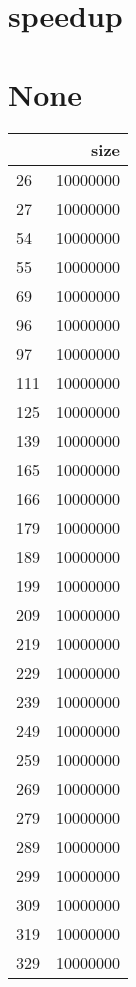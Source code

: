 \documentclass{article}
\begin{document}
\tableofcontents

\section{speedup}


\section{None}
\label{sec:None}
\begin{tabular}{lr}
\toprule
{} &      size \\
\midrule
26  &  10000000 \\
27  &  10000000 \\
54  &  10000000 \\
55  &  10000000 \\
69  &  10000000 \\
96  &  10000000 \\
97  &  10000000 \\
111 &  10000000 \\
125 &  10000000 \\
139 &  10000000 \\
165 &  10000000 \\
166 &  10000000 \\
179 &  10000000 \\
189 &  10000000 \\
199 &  10000000 \\
209 &  10000000 \\
219 &  10000000 \\
229 &  10000000 \\
239 &  10000000 \\
249 &  10000000 \\
259 &  10000000 \\
269 &  10000000 \\
279 &  10000000 \\
289 &  10000000 \\
299 &  10000000 \\
309 &  10000000 \\
319 &  10000000 \\
329 &  10000000 \\
\bottomrule
\end{tabular}
\end{document}
